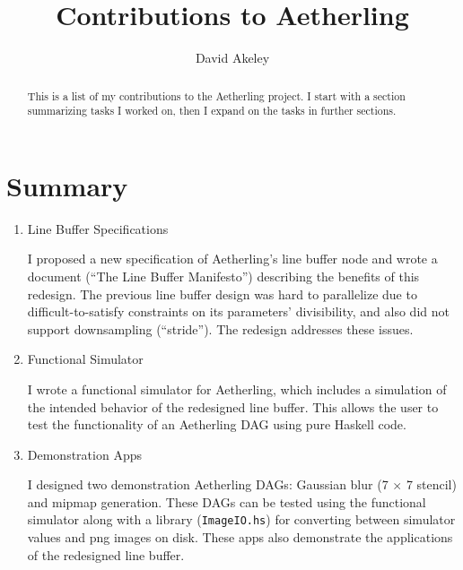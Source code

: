 \documentclass[12pt]{article}
\begin{document}
\title{Contributions to Aetherling}
\author{David Akeley}
\maketitle

\begin{abstract}
This is a list of my contributions to the Aetherling project. I start
with a section summarizing tasks I worked on, then I expand on the
tasks in further sections.
\end{abstract}

\section{Summary}

\begin{enumerate}

\item Line Buffer Specifications

I proposed a new specification of Aetherling's line buffer node and
wrote a document (``The Line Buffer Manifesto'') describing the
benefits of this redesign. The previous line buffer design was hard to
parallelize due to difficult-to-satisfy constraints on its parameters'
divisibility, and also did not support downsampling (``stride'').
The redesign addresses these issues.


\item Functional Simulator

I wrote a functional simulator for Aetherling, which includes a
simulation of the intended behavior of the redesigned line
buffer. This allows the user to test the functionality of an
Aetherling DAG using pure Haskell code.

\item Demonstration Apps

I designed two demonstration Aetherling DAGs: Gaussian blur (7 $\times$
7 stencil) and mipmap generation. These DAGs can be tested using the
functional simulator along with a library (\texttt{ImageIO.hs}) for
converting between simulator values and png images on disk. These apps
also demonstrate the applications of the redesigned line buffer.


\end{enumerate}
\end{document}
